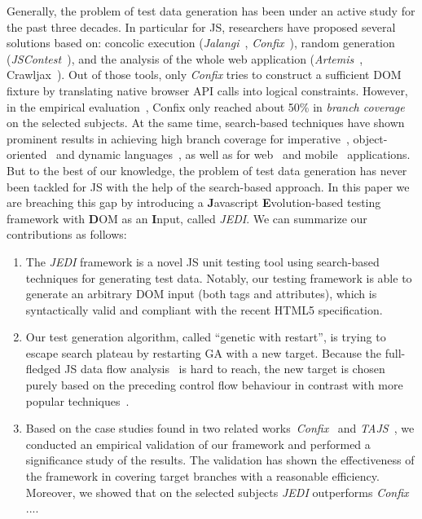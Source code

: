 Generally, the problem of test data generation has been under an active study for the past three decades. In particular for JS, researchers have proposed several solutions based on: concolic execution (\emph{Jalangi}~\cite{sen2013jalangi}, \emph{Confix}~\cite{amin:ase15}), random generation (\emph{JSContest}~\cite{heidegger2010contract}), and the analysis of the whole web application (\emph{Artemis}~\cite{artemis2011}, Crawljax~\cite{mesbah2012crawling}). Out of those tools, only \emph{Confix} tries to construct a sufficient DOM fixture by translating native browser API calls into logical constraints. However, in the empirical evaluation~\cite{amin:ase15}, Confix only reached about 50\% in \emph{branch coverage} on the selected subjects. At the same time, search-based techniques have shown prominent results in achieving high branch coverage for imperative~\cite{wegener2001evolutionary}, object-oriented~\cite{fraser2011evosuite} and dynamic languages~\cite{irawan2016test, wibowo2015unit}, as well as for web~\cite{alshahwan2011automated} and mobile~\cite{mao2016sapienz} applications. But to the best of our knowledge, the problem of test data generation has never been tackled for JS with the help of the search-based approach. In this paper we are breaching this gap by introducing a \textbf{J}avascript \textbf{E}volution-based testing framework with \textbf{D}OM as an \textbf{I}nput, called \emph{JEDI}. We can summarize our contributions as follows:
\begin{enumerate}[leftmargin=5mm]
\item The \emph{JEDI} framework is a novel JS unit testing tool using search-based techniques for generating test data. Notably, our testing framework is able to generate an arbitrary DOM input (both tags and attributes), which is syntactically valid and compliant with the recent HTML5 specification.
\item Our test generation algorithm, called ``genetic with restart'', is trying to escape search plateau by restarting GA with a new target. Because the full-fledged JS data flow analysis~\cite{jang2009points} is hard to reach, the new target is chosen purely based on the preceding control flow behaviour in contrast with more popular techniques~\cite{ferguson1996chaining}.
\item Based on the case studies found in two related works~\emph{Confix}~\cite{amin:ase15} and \emph{TAJS}~\cite{dom2011}, we conducted an empirical validation of our framework and performed a significance study of the results. The validation has shown the effectiveness of the framework in covering target branches with a reasonable efficiency. Moreover, we showed that on the selected subjects \emph{JEDI} outperforms \emph{Confix} ....
\end{enumerate}

